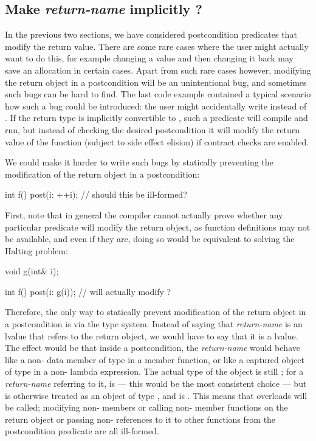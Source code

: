 \subsection{Make \emph{return-name} implicitly ?}

In the previous two sections, we have considered postcondition predicates that modify the return value. There are some rare cases where the user might actually want to do this, for example changing a value and then changing it back may save an allocation in certain cases. Apart from such rare cases however, modifying the return object in a postcondition will be an unintentional bug, and sometimes such bugs can be hard to find. The last code example contained a typical scenario how such a bug could be introduced: the user might accidentally write \tcode{=} instead of \tcode{==}. If the return type is implicitly convertible to , such a predicate will compile and run, but instead of checking the desired postcondition it will modify the return value of the function (subject to side effect elision) if contract checks are enabled.

We could make it harder to write such bugs by statically preventing the modification of the return object in a postcondition:

\begin{codeblock}
int f()
  post(i: ++i); // should this be ill-formed?
\end{codeblock}

First, note that in general the compiler cannot actually prove whether any particular predicate will modify the return object, as function definitions may not be available, and even if they are, doing so would be equivalent to solving the Halting problem:

\begin{codeblock}
void g(int& i); 

int f()
  post(i: g(i)); // will  actually modify ?
\end{codeblock}
 
Therefore, the only way to statically prevent modification of the return object in a postcondition is via the type system. Instead of saying that \emph{return-name} is an lvalue that refers to the return object, we would have to say that it is a  lvalue. The effect would be that inside a postcondition, the \emph{return-name} would behave like a non- data member of type  in a  member function, or like a captured object of type  in a non- lambda expression. The actual type of the object is still ; for a \emph{return-name}  referring to it,  is  --- this would be the most consistent choice --- but  is otherwise treated as an object of type , and  is . This means that  overloads will be called; modifying non- members or calling non- member functions on the return object or passing non- references to it to other functions from the postcondition predicate are all ill-formed.

